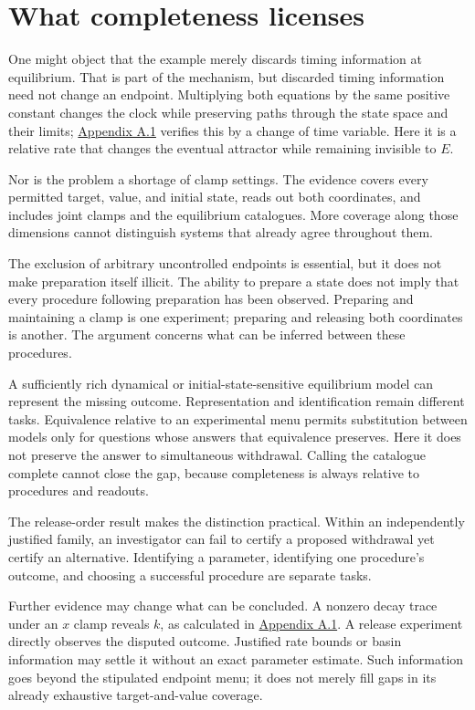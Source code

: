 \section*{What completeness licenses}

One might object that the example merely discards timing information at equilibrium. That is part of the mechanism, but discarded timing information need not change an endpoint. Multiplying both equations by the same positive constant changes the clock while preserving paths through the state space and their limits; \hyperref[app:a.1]{Appendix A.1} verifies this by a change of time variable. Here it is a relative rate that changes the eventual attractor while remaining invisible to \(E\).

Nor is the problem a shortage of clamp settings. The evidence covers every permitted target, value, and initial state, reads out both coordinates, and includes joint clamps and the equilibrium catalogues. More coverage along those dimensions cannot distinguish systems that already agree throughout them.

The exclusion of arbitrary uncontrolled endpoints is essential, but it does not make preparation itself illicit. The ability to prepare a state does not imply that every procedure following preparation has been observed. Preparing and maintaining a clamp is one experiment; preparing and releasing both coordinates is another. The argument concerns what can be inferred between these procedures.

A sufficiently rich dynamical or initial-state-sensitive equilibrium model can represent the missing outcome. Representation and identification remain different tasks. Equivalence relative to an experimental menu permits substitution between models only for questions whose answers that equivalence preserves. Here it does not preserve the answer to simultaneous withdrawal. Calling the catalogue complete cannot close the gap, because completeness is always relative to procedures and readouts.

The release-order result makes the distinction practical. Within an independently justified family, an investigator can fail to certify a proposed withdrawal yet certify an alternative. Identifying a parameter, identifying one procedure’s outcome, and choosing a successful procedure are separate tasks.

Further evidence may change what can be concluded. A nonzero decay trace under an \(x\) clamp reveals \(k\), as calculated in \hyperref[app:a.1]{Appendix A.1}. A release experiment directly observes the disputed outcome. Justified rate bounds or basin information may settle it without an exact parameter estimate. Such information goes beyond the stipulated endpoint menu; it does not merely fill gaps in its already exhaustive target-and-value coverage.


